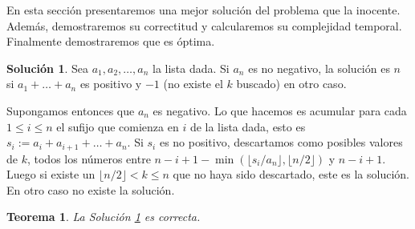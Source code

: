 \documentclass[10pt]{amsart}
\newtheorem{teo}[theorem]{Teorema}
\theoremstyle{definition}
\newtheorem{sol}[theorem]{Soluci\'on}
\numberwithin{equation}{section}
\begin{document}
		En esta secci\'on presentaremos una mejor soluci\'on del problema que la inocente. Adem\'as, demostraremos su correctitud y calcularemos su complejidad temporal. Finalmente demostraremos que es \'optima.
		
	\begin{sol}\label{sol_optima}
		Sea $a_1, a_2, \dots, a_n$ la lista dada. Si $a_n$ es no negativo, la soluci\'on es $n$ si $a_1 + \dots + a_n$ es positivo y $-1$ (no existe el $k$ buscado) en otro caso.
		
		Supongamos entonces que $a_n$ es negativo. Lo que hacemos es acumular para cada $1 \le i \le n$ el sufijo que comienza en $i$ de la lista dada, esto es $s_i := a_i + a_{i +1} + \dots + a_n$. Si $s_i$ es no positivo, descartamos como posibles valores de $k$, todos los n\'umeros entre $n - i + 1 - \min(\lfloor s_i/a_n \rfloor, \lfloor n/2 \rfloor)$ y $n - i + 1$. Luego si existe un $\lfloor n/2 \rfloor < k \le n$ que no haya sido descartado, este es la soluci\'on. En otro caso no existe la soluci\'on.
	\end{sol}

	
	\begin{teo}
		La Soluci\'on \ref{sol_optima} es correcta. 
	\end{teo}
\end{document}
